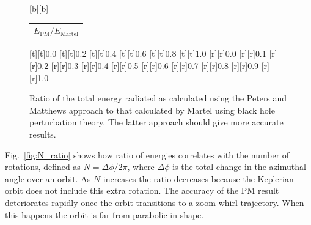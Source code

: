 \documentclass[aps,prd,reprint,showpacs,groupedaddress]{revtex4-1}
\newcommand{\Figref}[1]{Fig.\ \ref{fig:#1}}
\begin{document}
\begin{figure}
{\begin{psfrags}
[b][b]{\color[rgb]{0,0,0}\setlength{\tabcolsep}{0pt}\begin{tabular}{c}{\Large$E_\text{PM}/E_\text{Martel}$}\end{tabular}}%
%
[t][t]{0.0}%
[t][t]{0.2}%
[t][t]{0.4}%
[t][t]{0.6}%
[t][t]{0.8}%
[t][t]{1.0}%
%
[r][r]{0.0}%
[r][r]{0.1}%
[r][r]{0.2}%
[r][r]{0.3}%
[r][r]{0.4}%
[r][r]{0.5}%
[r][r]{0.6}%
[r][r]{0.7}%
[r][r]{0.8}%
[r][r]{0.9}%
[r][r]{1.0}%
%
%
\end{psfrags}%
}
\caption{Ratio of the total energy radiated as calculated using the Peters and Matthews\cite{Peters1963} approach to that calculated by Martel\cite{Martel2004a} using black hole perturbation theory. The latter approach should give more accurate results.}
\end{figure}
\Figref{N_ratio} shows how ratio of energies correlates with the number of rotations, defined as $N = {\Delta \phi}/{2\pi}$, where $\Delta \phi$ is the total change in the azimuthal angle over an orbit. As $N$ increases the ratio decreases because the Keplerian orbit does not include this extra rotation. The accuracy of the PM result deteriorates rapidly once the orbit transitions to a zoom-whirl trajectory. When this happens the orbit is far from parabolic in shape.
\end{document}
